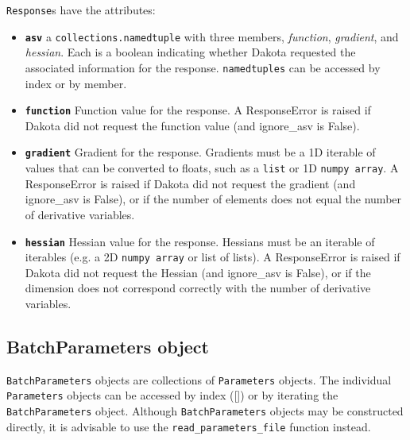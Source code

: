 {\tt Response}s have the attributes:

\begin{itemize}
  \item {} \label{index:dakota.interfacing.Response.asv}\textbf{\texttt{asv}} a {\tt collections.namedtuple} with three members, \emph{function}, \emph{gradient}, and \emph{hessian}.
Each is a boolean indicating whether Dakota requested the
associated information for the response. {\tt namedtuples} can be
accessed by index or by member.

  \item {} \label{index:dakota.interfacing.Response.function}\textbf{\texttt{function}} Function value for the response. A ResponseError
is raised if Dakota did not request the function value (and
ignore\_asv is False).
  \item{} \label{index:dakota.interfacing.Response.gradient}\textbf{\texttt{gradient}} Gradient for the response. Gradients must be a 1D iterable of values that can be converted to floats, such as a {\tt list} or 1D {\tt numpy array}. A ResponseError is raised if Dakota did not request the gradient (and ignore\_asv is False), or if the number of elements does not equal the number of derivative variables.

  \item {} \label{index:dakota.interfacing.Response.hessian}\textbf{\texttt{hessian}} Hessian value for the response. Hessians must be an iterable of iterables (e.g. a 2D {\tt numpy array} or list of lists). A ResponseError is raised if Dakota did not request the Hessian (and ignore\_asv is False), or if the dimension does not correspond correctly with the number of derivative variables.

\end{itemize}

\subsection{BatchParameters object}

{\tt BatchParameters} objects are collections of {\tt Parameters} objects. The individual {\tt Parameters} objects can be
accessed by index ({[}{]}) or by iterating the {\tt BatchParameters} object. Although {\tt BatchParameters} objects may be 
constructed directly, it is advisable to use the {\tt read\_parameters\_file} function instead.

